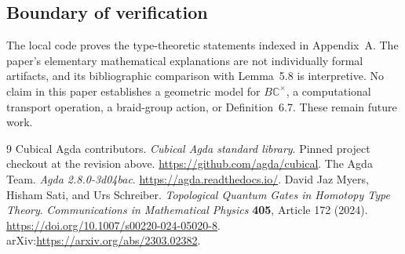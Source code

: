 \subsection{Boundary of verification}
The local code proves the type-theoretic statements indexed in Appendix~A. The paper's elementary mathematical explanations are not individually formal artifacts, and its bibliographic comparison with Lemma~5.8 is interpretive. No claim in this paper establishes a geometric model for $B\mathbb{C}^{\times}$, a computational transport operation, a braid-group action, or Definition~6.7. These remain future work.

\begin{thebibliography}{9}
 Cubical Agda contributors. \emph{Cubical Agda standard library}. Pinned project checkout at the revision above. \url{https://github.com/agda/cubical}.
 The Agda Team. \emph{Agda 2.8.0-3d04bac}. \url{https://agda.readthedocs.io/}.
 David Jaz Myers, Hisham Sati, and Urs Schreiber. \emph{Topological Quantum Gates in Homotopy Type Theory}. \emph{Communications in Mathematical Physics} \textbf{405}, Article 172 (2024). \url{https://doi.org/10.1007/s00220-024-05020-8}. arXiv:\url{https://arxiv.org/abs/2303.02382}.
\end{thebibliography}

